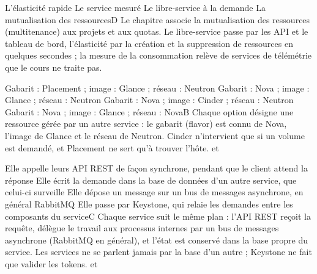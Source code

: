   {L'élasticité rapide}
  {Le service mesuré}
  {Le libre-service à la demande}
  {La mutualisation des ressources}{D}
  {Le chapitre associe la mutualisation des ressources (multitenance) aux projets et aux quotas. Le libre-service passe par les API et le tableau de bord, l'élasticité par la création et la suppression de ressources en quelques secondes ; la mesure de la consommation relève de services de télémétrie que le cours ne traite pas.}
  {}

  {Gabarit : Placement ; image : Glance ; réseau : Neutron}
  {Gabarit : Nova ; image : Glance ; réseau : Neutron}
  {Gabarit : Nova ; image : Cinder ; réseau : Neutron}
  {Gabarit : Nova ; image : Glance ; réseau : Nova}{B}
  {Chaque option désigne une ressource gérée par un autre service : le gabarit (flavor) est connu de Nova, l'image de Glance et le réseau de Neutron. Cinder n'intervient que si un volume est demandé, et Placement ne sert qu'à trouver l'hôte.}
  { et }

  {Elle appelle leurs API REST de façon synchrone, pendant que le client attend la réponse}
  {Elle écrit la demande dans la base de données d'un autre service, que celui-ci surveille}
  {Elle dépose un message sur un bus de messages asynchrone, en général RabbitMQ}
  {Elle passe par Keystone, qui relaie les demandes entre les composants du service}{C}
  {Chaque service suit le même plan : l'API REST reçoit la requête, délègue le travail aux processus internes par un bus de messages asynchrone (RabbitMQ en général), et l'état est conservé dans la base propre du service. Les services ne se parlent jamais par la base d'un autre ; Keystone ne fait que valider les tokens.}
  { et }

